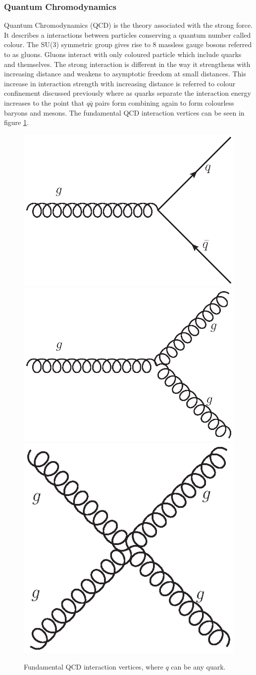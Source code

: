     \subsubsection*{Quantum Chromodynamics}
    
    Quantum Chromodynamics (QCD) is the theory associated with the strong force. It describes a interactions between particles conserving a quantum number called colour. The SU(3) symmetric group gives rise to 8 massless gauge bosons referred to as gluons. Gluons interact with only coloured particle which include quarks and themselves. The strong interaction is different in the way it strengthens with increasing distance and weakens to asymptotic freedom at small distances. This increase in interaction strength with increasing distance is referred to colour confinement discussed previously where as quarks separate the interaction energy increases to the point that $q\bar{q}$ pairs form combining again to form colourless baryons and mesons. The fundamental QCD interaction vertices can be seen in figure \ref{fig:QCD}.

    \begin{figure}[h]
        \begin{center}
        \includegraphics[width=0.34\linewidth]{images/g_quark.eps}
        \includegraphics[width=0.34\linewidth]{images/g_gg.eps}
        \includegraphics[width=0.25\linewidth]{images/gg_gg.eps}
        \end{center}
        \caption{Fundamental QCD interaction vertices, where $q$ can be any quark.}
        \label{fig:QCD}
    \end{figure}


